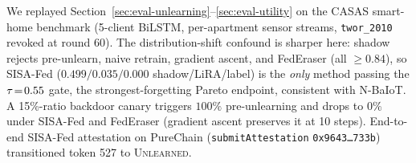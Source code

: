 We replayed Section~\ref{sec:eval-unlearning}--\ref{sec:eval-utility} on
the CASAS smart-home benchmark (5-client BiLSTM, per-apartment
sensor streams, \texttt{twor\_2010} revoked at round 60). The
distribution-shift confound is sharper here: shadow rejects
pre-unlearn, naive retrain, gradient ascent, and FedEraser (all
$\ge\!0.84$), so SISA-Fed ($0.499/0.035/0.000$ shadow/LiRA/label)
is the \emph{only} method passing the $\tau\!=\!0.55$ gate,
the strongest-forgetting Pareto endpoint, consistent with N-BaIoT.
A 15\%-ratio backdoor canary triggers $100\%$ pre-unlearning and
drops to $0\%$ under SISA-Fed and FedEraser (gradient ascent
preserves it at 10 steps). End-to-end SISA-Fed attestation on
PureChain (\texttt{submitAttestation} \texttt{0x9643\ldots 733b})
transitioned token 527 to \textsc{Unlearned}.

